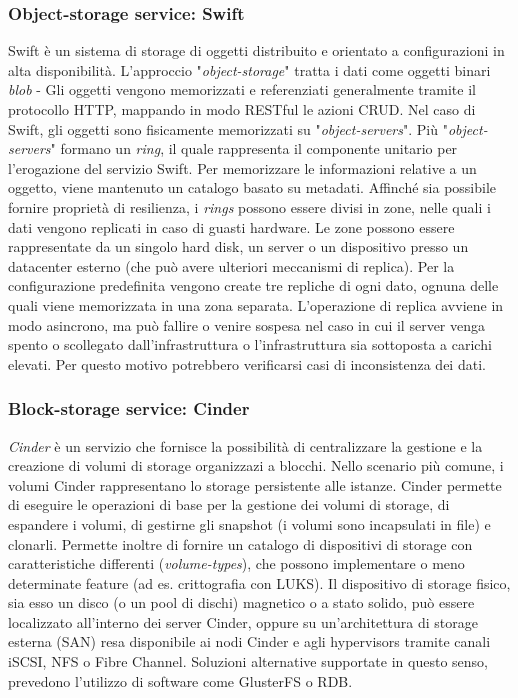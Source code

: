 \documentclass[../main.tex]{subfiles}
\begin{document}
\subsubsection{Object-storage service: Swift}
Swift è un sistema di storage di oggetti distribuito e orientato a configurazioni in alta disponibilità.
L'approccio "\textit{object-storage}" tratta i dati come oggetti binari \textit{blob} - 
Gli oggetti vengono memorizzati e referenziati generalmente tramite il protocollo HTTP, mappando in modo RESTful le azioni CRUD.
Nel caso di Swift, gli oggetti sono fisicamente memorizzati su "\textit{object-servers}".
Più "\textit{object-servers}" formano un \textit{ring}, il quale rappresenta il componente unitario per l'erogazione del servizio Swift.
Per memorizzare le informazioni relative a un oggetto, viene mantenuto un catalogo basato su metadati.
Affinché sia possibile fornire proprietà di resilienza, i \textit{rings} possono essere divisi in zone, nelle quali i dati vengono replicati in caso di guasti hardware.
Le zone possono essere rappresentate da un singolo hard disk, un server o un dispositivo presso un datacenter esterno (che può avere ulteriori meccanismi di replica).
Per la configurazione predefinita vengono create tre repliche di ogni dato, ognuna delle quali viene memorizzata in una zona separata.
L'operazione di replica avviene in modo asincrono, ma può fallire o venire sospesa nel caso in cui il server venga spento o scollegato dall'infrastruttura o l'infrastruttura sia sottoposta a carichi elevati.
Per questo motivo potrebbero verificarsi casi di inconsistenza dei dati.

\subsubsection{Block-storage service: Cinder}
\textit{Cinder} è un servizio che fornisce la possibilità di centralizzare la gestione e la creazione di volumi di storage organizzazi a blocchi.
Nello scenario più comune, i volumi Cinder rappresentano lo storage persistente alle istanze.
Cinder permette di eseguire le operazioni di base per la gestione dei volumi di storage, di espandere i volumi, di gestirne gli snapshot (i volumi sono incapsulati in file) e clonarli.
Permette inoltre di fornire un catalogo di dispositivi di storage con caratteristiche differenti (\textit{volume-types}), che possono implementare o meno determinate feature (ad es. crittografia con LUKS).
Il dispositivo di storage fisico, sia esso un disco (o un pool di dischi) magnetico o a stato solido, può essere localizzato all'interno dei server Cinder, oppure su un'architettura di storage esterna (SAN) resa disponibile ai nodi Cinder e agli hypervisors tramite canali iSCSI, NFS o Fibre Channel.
Soluzioni alternative supportate in questo senso, prevedono l'utilizzo di software come GlusterFS o RDB.
\end{document}
